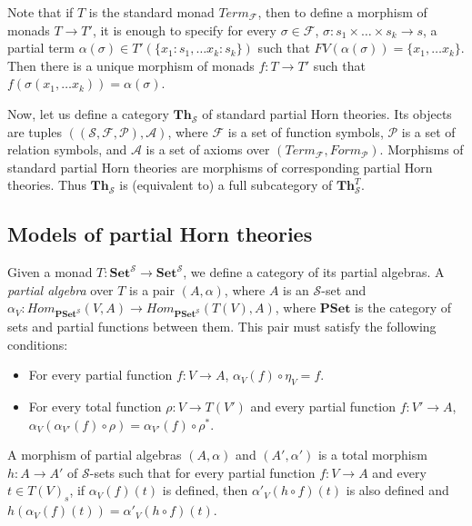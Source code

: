 \documentclass[reqno]{amsart}
\theoremstyle{definition}
\theoremstyle{remark}
\newcommand{\cat}[1]{\mathbf{#1}}
\newcommand{\Set}{\cat{Set}}
\newcommand{\PSet}{\cat{PSet}}
\newcommand{\Th}{\cat{Th}}
\numberwithin{figure}{section}
\begin{document}
Note that if $T$ is the standard monad $Term_\mathcal{F}$, then to define a morphism of monads $T \to T'$,
    it is enough to specify for every $\sigma \in \mathcal{F}$, $\sigma : s_1 \times \ldots \times s_k \to s$,
    a partial term $\alpha(\sigma) \in T'(\{ x_1 : s_1, \ldots x_k : s_k \})$ such that $FV(\alpha(\sigma)) = \{ x_1, \ldots x_k \}$.
Then there is a unique morphism of monads $f : T \to T'$ such that $f(\sigma(x_1, \ldots x_k)) = \alpha(\sigma)$.

Now, let us define a category $\Th_\mathcal{S}$ of standard partial Horn theories.
Its objects are tuples $((\mathcal{S},\mathcal{F},\mathcal{P}),\mathcal{A})$, where $\mathcal{F}$ is a set of function symbols,
    $\mathcal{P}$ is a set of relation symbols, and $\mathcal{A}$ is a set of axioms over $(Term_\mathcal{F},Form_\mathcal{P})$.
Morphisms of standard partial Horn theories are morphisms of corresponding partial Horn theories.
Thus $\Th_\mathcal{S}$ is (equivalent to) a full subcategory of $\Th^T_\mathcal{S}$.

\subsection{Models of partial Horn theories}

Given a monad $T : \Set^\mathcal{S} \to \Set^\mathcal{S}$, we define a category of its partial algebras.
A \emph{partial algebra} over $T$ is a pair $(A,\alpha)$, where $A$ is an $\mathcal{S}$-set and $\alpha_V : Hom_{\PSet^\mathcal{S}}(V,A) \to Hom_{\PSet^\mathcal{S}}(T(V),A)$,
    where $\PSet$ is the category of sets and partial functions between them.
This pair must satisfy the following conditions:
\begin{itemize}
\item For every partial function $f : V \to A$, $\alpha_V(f) \circ \eta_V = f$.
\item For every total function $\rho : V \to T(V')$ and every partial function $f : V' \to A$, $\alpha_V(\alpha_{V'}(f) \circ \rho) = \alpha_{V'}(f) \circ \rho^*$.
\end{itemize}
A morphism of partial algebras $(A,\alpha)$ and $(A',\alpha')$ is a total morphism $h : A \to A'$ of $\mathcal{S}$-sets
    such that for every partial function $f : V \to A$ and every $t \in T(V)_s$, if $\alpha_V(f)(t)$ is defined,
    then $\alpha'_V(h \circ f)(t)$ is also defined and $h(\alpha_V(f)(t)) = \alpha'_V(h \circ f)(t)$.
\end{document}
